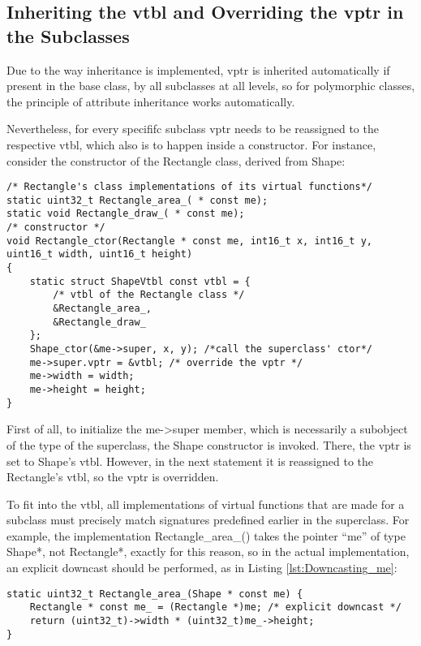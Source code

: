 \subsection{Inheriting the vtbl and Overriding the vptr in the Subclasses}
Due to the way inheritance is implemented, vptr is inherited automatically if present in the base class, by all subclasses at all levels, so for polymorphic classes, the principle of attribute inheritance works automatically.

Nevertheless, for every specififc subclass vptr needs to be reassigned to the respective vtbl, which also is to happen inside a constructor. For instance, consider the constructor of the Rectangle class, derived from Shape:

\begin{lstlisting}[caption={Overriding the vtbl and vptr in the subclass Rectangle}, label=lst:Overriding_vtbl_vptr]
/* Rectangle's class implementations of its virtual functions*/ 
static uint32_t Rectangle_area_( * const me);
static void Rectangle_draw_( * const me);
/* constructor */
void Rectangle_ctor(Rectangle * const me, int16_t x, int16_t y,
uint16_t width, uint16_t height)
{
    static struct ShapeVtbl const vtbl = { 
        /* vtbl of the Rectangle class */
        &Rectangle_area_,
        &Rectangle_draw_
    };
    Shape_ctor(&me->super, x, y); /*call the superclass' ctor*/
    me->super.vptr = &vtbl; /* override the vptr */
    me->width = width;
    me->height = height; 
}
\end{lstlisting} 

First of all, to initialize the me->super member, which is necessarily a subobject of the type of the superclass, the Shape constructor is invoked. There, the vptr is set to Shape’s vtbl. However, in the next statement it is reassigned to the Rectangle’s vtbl, so the vptr is overridden.

To fit into the vtbl, all implementations of virtual functions that are made for a subclass must precisely match signatures predefined earlier in the superclass. For example, the implementation Rectangle\_area\_() takes the pointer “me” of type Shape*, not Rectangle*, exactly for this reason, so in the actual implementation, an explicit downcast should be performed, as in Listing \ref{lst:Downcasting_me}:

\begin{lstlisting}[caption={Explicit downcasting of the “me” pointer}, label=lst:Downcasting_me]
static uint32_t Rectangle_area_(Shape * const me) {
    Rectangle * const me_ = (Rectangle *)me; /* explicit downcast */
    return (uint32_t)->width * (uint32_t)me_->height;
}
\end{lstlisting}

